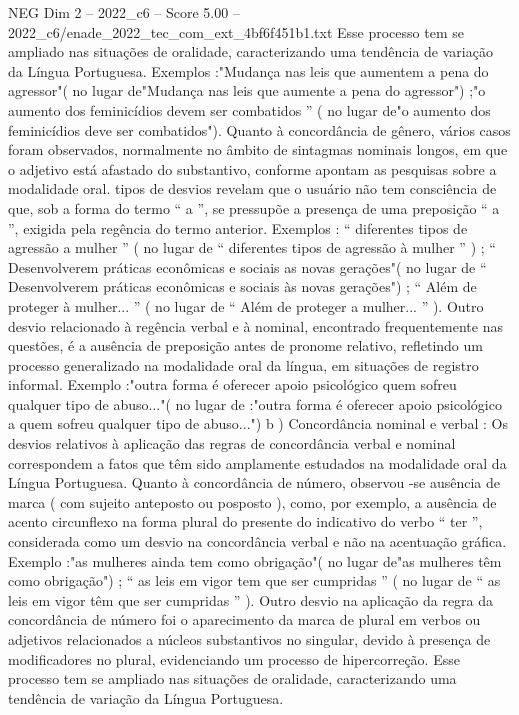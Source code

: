 \begin{textsample}{NEG Dim 2 – 2022\_c6 – Score 5.00 – 2022\_c6/enade\_2022\_tec\_com\_ext\_4bf6f451b1.txt}
Esse processo tem se ampliado nas situações de oralidade, caracterizando uma tendência de variação da Língua Portuguesa.
Exemplos :"Mudança nas leis que aumentem a pena do agressor"( no lugar de"Mudança nas leis que aumente a pena do agressor") ;"o aumento dos feminicídios devem ser combatidos ” ( no lugar de"o aumento dos feminicídios deve ser combatidos").
Quanto à concordância de gênero, vários casos foram observados, normalmente no âmbito de sintagmas nominais longos, em que o adjetivo está afastado do substantivo, conforme apontam as pesquisas sobre a modalidade oral. tipos de desvios revelam que o usuário não tem consciência de que, sob a forma do termo “ a ”, se pressupõe a presença de uma preposição “ a ”, exigida pela regência do termo anterior.
Exemplos : “ diferentes tipos de agressão a mulher ” ( no lugar de “ diferentes tipos de agressão à mulher ” ) ; “ Desenvolverem práticas econômicas e sociais as novas gerações"( no lugar de “ Desenvolverem práticas econômicas e sociais às novas gerações") ; “ Além de proteger à mulher... ” ( no lugar de “ Além de proteger a mulher... ” ).
Outro desvio relacionado à regência verbal e à nominal, encontrado frequentemente nas questões, é a ausência de preposição antes de pronome relativo, refletindo um processo generalizado na modalidade oral da língua, em situações de registro informal.
Exemplo :"outra forma é oferecer apoio psicológico quem sofreu qualquer tipo de abuso..."( no lugar de :"outra forma é oferecer apoio psicológico a quem sofreu qualquer tipo de abuso...") b ) Concordância nominal e verbal : Os desvios relativos à aplicação das regras de concordância verbal e nominal correspondem a fatos que têm sido amplamente estudados na modalidade oral da Língua Portuguesa.
Quanto à concordância de número, observou -se ausência de marca ( com sujeito anteposto ou posposto ), como, por exemplo, a ausência de acento circunflexo na forma plural do presente do indicativo do verbo “ ter ”, considerada como um desvio na concordância verbal e não na acentuação gráfica.
Exemplo :"as mulheres ainda tem como obrigação"( no lugar de"as mulheres têm como obrigação") ; “ as leis em vigor tem que ser cumpridas ” ( no lugar de “ as leis em vigor têm que ser cumpridas ” ).
Outro desvio na aplicação da regra da concordância de número foi o aparecimento da marca de plural em verbos ou adjetivos relacionados a núcleos substantivos no singular, devido à presença de modificadores no plural, evidenciando um processo de hipercorreção.
Esse processo tem se ampliado nas situações de oralidade, caracterizando uma tendência de variação da Língua Portuguesa.

\end{textsample}
